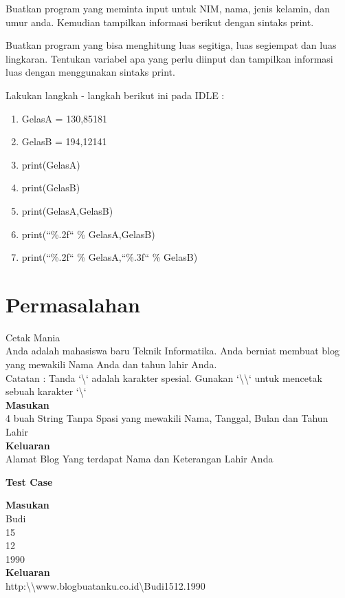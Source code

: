 \begin{latihan}
Buatkan program yang meminta input untuk NIM, nama, jenis kelamin, dan umur anda. Kemudian tampilkan informasi berikut dengan sintaks print.
\end{latihan}

\begin{latihan}
Buatkan program yang bisa menghitung luas segitiga, luas segiempat dan luas lingkaran. Tentukan variabel apa yang perlu diinput dan tampilkan informasi luas dengan menggunakan sintaks print.
\end{latihan}

\begin{latihan}
\label{latihan:Gelas}
Lakukan langkah - langkah berikut ini pada IDLE : 
\begin{enumerate}
	\item GelasA = 130,85181
	\item GelasB = 194,12141
	\item print(GelasA)
	\item print(GelasB)
	\item print(GelasA,GelasB)
	\item print(``\%.2f`` \% GelasA,GelasB)
	\item print(``\%.2f`` \% GelasA,``\%.3f`` \% GelasB)
\end{enumerate}
\end{latihan}

\newpage
\section{Permasalahan}
\begin{permasalahan}{Cetak Mania}\\
\label{prob:CetakMania}
Anda adalah mahasiswa baru Teknik Informatika. Anda berniat membuat blog yang mewakili Nama Anda dan tahun lahir Anda.\\
Catatan : Tanda `\textbackslash` adalah karakter spesial. Gunakan `\textbackslash\textbackslash` untuk mencetak sebuah karakter `\textbackslash` \\
	\textbf{Masukan}\\
	4 buah String Tanpa Spasi yang mewakili Nama, Tanggal, Bulan dan Tahun Lahir \\
	\textbf{Keluaran}\\
	Alamat Blog Yang terdapat Nama dan Keterangan Lahir Anda \\
	\begin{center}
	\textbf{Test Case}\\
	\end{center}
	\textbf{Masukan}\\
	Budi \\
	15 \\
	12 \\
	1990 \\
	\textbf{Keluaran}\\
	http:\textbackslash\textbackslash www.blogbuatanku.co.id\textbackslash Budi1512.1990 \\	
\end{permasalahan}

